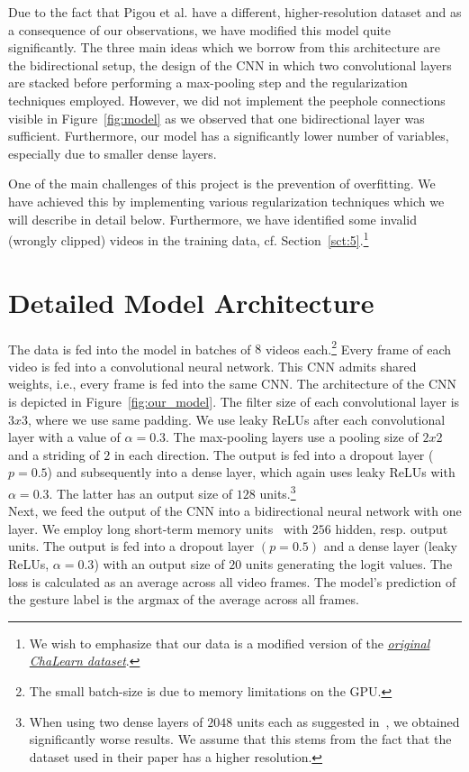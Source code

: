 \documentclass[sigconf]{acmart}
\begin{document}
	Due to the fact that Pigou et al. have a different, higher-resolution dataset and as a consequence of our observations, we have modified this model quite significantly. The three main ideas which we borrow from this architecture are the bidirectional setup, the design of the CNN in which two convolutional layers are stacked before performing a max-pooling step and the regularization techniques employed. However, we did not implement the peephole connections visible in Figure~\ref{fig:model} as we observed that one bidirectional layer was sufficient. Furthermore, our model has a significantly lower number of variables, especially due to smaller dense layers.
	
	One of the main challenges of this project is the prevention of overfitting. We have achieved this by implementing various regularization techniques which we will describe in detail below. Furthermore, we have identified some invalid (wrongly clipped) videos in the training data, cf. Section~\ref{sct:5}.\footnote{We wish to emphasize that our data is a modified version of the \href{http://chalearnlap.cvc.uab.es/dataset/13/description/}{\textit{original ChaLearn dataset}}.}
	
	\section{Detailed Model Architecture}
	
	The data is fed into the model in batches of $8$ videos each.\footnote{The small batch-size is due to memory limitations on the GPU.} Every frame of each video is fed into a convolutional neural network. This CNN admits shared weights, i.e., every frame is fed into the same CNN. The architecture of the CNN is depicted in Figure~\ref{fig:our_model}. The filter size of each convolutional layer is $3x3$, where we use same padding. We use leaky ReLUs after each convolutional layer with a value of $\alpha = 0.3$. The max-pooling layers use a pooling size of $2x2$ and a striding of $2$ in each direction. The output is fed into a dropout layer ($p=0.5$) and subsequently into a dense layer, which again uses leaky ReLUs with $\alpha = 0.3$. The latter has an output size of $128$ units.\footnote{When using two dense layers of $2048$ units each as suggested in~\cite{pigou}, we obtained significantly worse results. We assume that this stems from the fact that the dataset used in their paper has a higher resolution.}\\
	
	Next, we feed the output of the CNN into a bidirectional neural network with one layer. We employ long short-term memory units~\cite{lstm} with $256$ hidden, resp. output units. The output is fed into a dropout layer $(p = 0.5)$ and a dense layer (leaky ReLUs, $\alpha = 0.3$) with an output size of $20$ units generating the logit values. The loss is calculated as an average across all video frames. The model's prediction of the gesture label is the $\mathrm{argmax}$ of the average across all frames.
	
\end{document}
